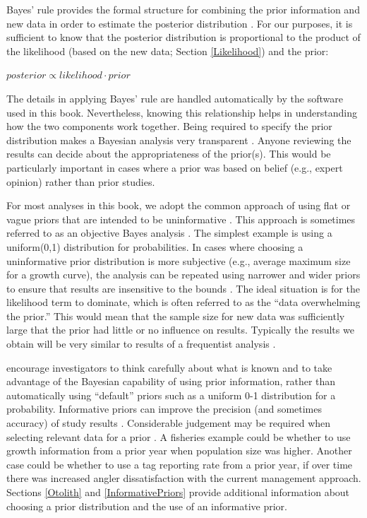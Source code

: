 \documentclass[
]{krantz}
\begin{document}
Bayes' rule provides the formal structure for combining the prior information and new data in order to estimate the posterior distribution \citep{link.etal_2002, kéry.schaub_2011}. For our purposes, it is sufficient to know that the posterior distribution is proportional to the product of the likelihood (based on the new data; Section \ref{Likelihood}) and the prior:

\(posterior \propto likelihood \cdot prior\)

The details in applying Bayes' rule are handled automatically by the software used in this book. Nevertheless, knowing this relationship helps in understanding how the two components work together. Being required to specify the prior distribution makes a Bayesian analysis very transparent \citep{kéry.schaub_2011}. Anyone reviewing the results can decide about the appropriateness of the prior(s). This would be particularly important in cases where a prior was based on belief (e.g., expert opinion) rather than prior studies.

For most analyses in this book, we adopt the common approach of using flat or vague priors that are intended to be uninformative \citep{royle.dorazio_2009, kéry.schaub_2011}. This approach is sometimes referred to as an objective Bayes analysis \citep{link.etal_2002}. The simplest example is using a uniform(0,1) distribution for probabilities. In cases where choosing a uninformative prior distribution is more subjective (e.g., average maximum size for a growth curve), the analysis can be repeated using narrower and wider priors to ensure that results are insensitive to the bounds \citep{kéry.schaub_2011}. The ideal situation is for the likelihood term to dominate, which is often referred to as the ``data overwhelming the prior.'' This would mean that the sample size for new data was sufficiently large that the prior had little or no influence on results. Typically the results we obtain will be very similar to results of a frequentist analysis \citep{link.etal_2002, mccarthy2007, kéry_2010, kéry.schaub_2011}.

\citet{banner.etal_2020} encourage investigators to think carefully about what is known and to take advantage of the Bayesian capability of using prior information, rather than automatically using ``default'' priors such as a uniform 0-1 distribution for a probability. Informative priors can improve the precision (and sometimes accuracy) of study results \citep[e.g.,][]{doll.jacquemin_2018}. Considerable judgement may be required when selecting relevant data for a prior \citep{lunn.etal2012}. A fisheries example could be whether to use growth information from a prior year when population size was higher. Another case could be whether to use a tag reporting rate from a prior year, if over time there was increased angler dissatisfaction with the current management approach. Sections \ref{Otolith} and \ref{InformativePriors} provide additional information about choosing a prior distribution and the use of an informative prior.
\end{document}
